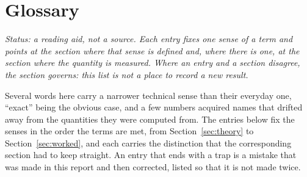 \section{Glossary}
\label{sec:glossary}

\noindent\emph{Status: a reading aid, not a source. Each entry fixes one sense of a term and points at the section
where that sense is defined and, where there is one, at the section where the quantity is measured. Where an entry
and a section disagree, the section governs: this list is not a place to record a new result.}

Several words here carry a narrower technical sense than their everyday one, ``exact'' being the obvious case, and
a few numbers acquired names that drifted away from the quantities they were computed from. The entries below fix
the senses in the order the terms are met, from Section~\ref{sec:theory} to Section~\ref{sec:worked}, and each
carries the distinction that the corresponding section had to keep straight. An entry that ends with a trap is a
mistake that was made in this report and then corrected, listed so that it is not made twice.


